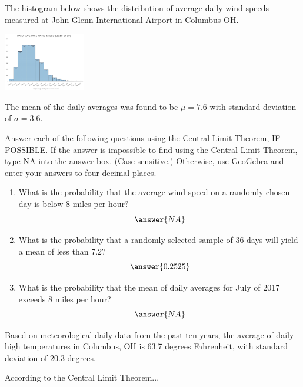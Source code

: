 \documentclass{ximera}
\begin{document}
\begin{problem}\label{prob:140hom6prob3}
The histogram below shows the distribution of average daily wind speeds measured at John Glenn International Airport in Columbus OH.
\begin{image}
   \includegraphics[height=1in]{140H6pic1.jpg}
 \end{image}
 The mean of the daily averages was found to be $\mu=7.6$ with standard deviation of $\sigma=3.6$.
 
 Answer each of the following questions using the Central Limit Theorem, IF POSSIBLE.  If the answer is impossible to find using the Central Limit Theorem, type NA into the answer box. (Case sensitive.)  Otherwise, use GeoGebra and enter your answers to four decimal places.
 \begin{enumerate}
     \item What is the probability that the average wind speed on a randomly chosen day is below 8 miles per hour?
     $$\answer{NA}$$
     \item What is the probability that a randomly selected sample of 36 days will yield a mean of less than 7.2?
     $$\answer{0.2525}$$
     \item What is the probability that the mean of daily averages for July of 2017 exceeds 8 miles per hour?
     $$\answer{NA}$$
     
 \end{enumerate}
\end{problem}
 



 
 \begin{problem}\label{prob:140hom6prob1}
 Based on meteorological daily data from the past ten years, the average of daily high temperatures in Columbus, OH is 63.7 degrees Fahrenheit, with standard deviation of 20.3 degrees. 
 
 According to the Central Limit Theorem...
     \begin{multipleChoice}  
\end{multipleChoice}

 \end{problem}
 
 
 
 
 
 
\end{document}
